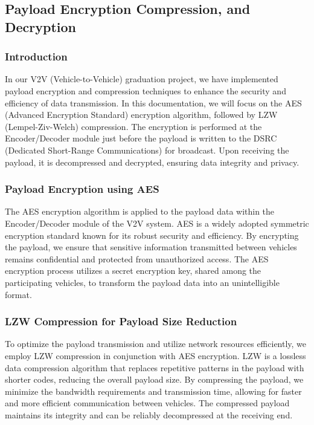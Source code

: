 \documentclass[
12pt,
oneside, 
onehalfspacing, 
nolistspacing, 
parskip, 
chapterinoneline, 
]{AASTCOMPUTER}
\begin{document}
\subsection{Payload Encryption Compression, and Decryption}

\subsubsection{Introduction}
In our V2V (Vehicle-to-Vehicle) graduation project, we have implemented payload encryption and compression techniques to enhance the security and efficiency of data transmission. In this documentation, we will focus on the AES (Advanced Encryption Standard) encryption algorithm, followed by LZW (Lempel-Ziv-Welch) compression. The encryption is performed at the Encoder/Decoder module just before the payload is written to the DSRC (Dedicated Short-Range Communications) for broadcast. Upon receiving the payload, it is decompressed and decrypted, ensuring data integrity and privacy.

\subsubsection{Payload Encryption using AES}
The AES encryption algorithm is applied to the payload data within the Encoder/Decoder module of the V2V system. AES is a widely adopted symmetric encryption standard known for its robust security and efficiency. By encrypting the payload, we ensure that sensitive information transmitted between vehicles remains confidential and protected from unauthorized access. The AES encryption process utilizes a secret encryption key, shared among the participating vehicles, to transform the payload data into an unintelligible format.

\subsubsection{LZW Compression for Payload Size Reduction}
To optimize the payload transmission and utilize network resources efficiently, we employ LZW compression in conjunction with AES encryption. LZW is a lossless data compression algorithm that replaces repetitive patterns in the payload with shorter codes, reducing the overall payload size. By compressing the payload, we minimize the bandwidth requirements and transmission time, allowing for faster and more efficient communication between vehicles. The compressed payload maintains its integrity and can be reliably decompressed at the receiving end.
\end{document}
